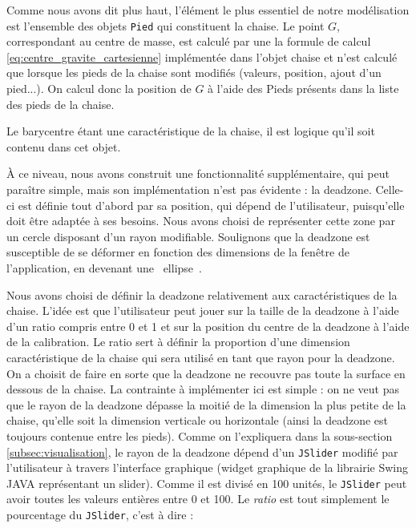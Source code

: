 \documentclass{polytech/polytech}
\begin{document}
Comme nous avons dit plus haut, l'élément le plus essentiel de notre modélisation est l'ensemble des objets \texttt{Pied} qui constituent la chaise.
Le point $G$, correspondant au centre de masse, est calculé par une la formule de calcul \eqref{eq:centre_gravite_cartesienne} implémentée dans l'objet chaise et n'est calculé que lorsque les pieds de la chaise sont modifiés (valeurs, position, ajout d'un pied...). On calcul donc la position de $G$ à l'aide des Pieds présents dans la liste des pieds de la chaise.

Le barycentre étant une caractéristique de la chaise, il est logique qu'il soit contenu dans cet objet.

À ce niveau, nous avons construit une fonctionnalité supplémentaire, qui peut paraître simple, mais son implémentation n'est pas évidente : la deadzone.
Celle-ci est définie tout d'abord par sa position, qui dépend de l'utilisateur, puisqu'elle doit être adaptée à ses besoins.
Nous avons choisi de représenter cette zone par un cercle disposant d'un rayon modifiable.
Soulignons que la deadzone est susceptible de se déformer en fonction des dimensions de la fenêtre de l'application, en devenant une \guillemotleft ~ellipse~\guillemotright .

Nous avons choisi de définir la deadzone relativement aux caractéristiques de la chaise. L'idée est que l'utilisateur peut jouer sur la taille de la deadzone à l'aide d'un ratio compris entre 0 et 1 et sur la position du centre de la deadzone à l'aide de la calibration. 
Le ratio sert à définir la proportion d'une dimension caractéristique de la chaise qui sera utilisé en tant que rayon pour la deadzone. 
On a choisit de faire en sorte que la deadzone ne recouvre pas toute la surface en dessous de la chaise. 
La contrainte à implémenter ici est simple : on ne veut pas que le rayon de la deadzone dépasse la moitié de la dimension la plus petite de la chaise, qu'elle soit la dimension verticale ou horizontale (ainsi la deadzone est toujours contenue entre les pieds).
Comme on l'expliquera dans la sous-section \ref{subsec:visualisation}, le rayon de la deadzone dépend d'un \texttt{JSlider} modifié par l'utilisateur à travers l'interface graphique (widget graphique de la librairie Swing JAVA représentant un slider).
Comme il est divisé en 100 unités, le \texttt{JSlider} peut avoir toutes les valeurs entières entre 0 et 100. Le \textit{ratio} est tout simplement le pourcentage du \texttt{JSlider}, c'est à dire :
\end{document}

